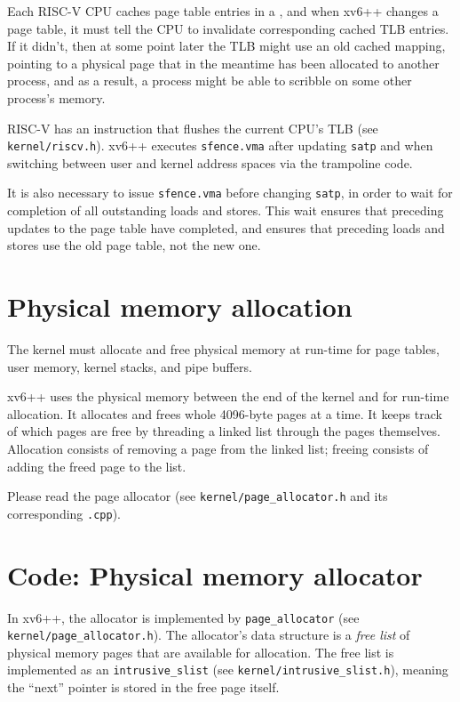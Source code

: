 Each RISC-V CPU caches page table entries in a
, and when xv6++ changes a
page table, it must tell the CPU to invalidate corresponding cached TLB
entries. If it didn't, then at some point later the TLB might use an old
cached mapping, pointing to a physical page that in the meantime has been
allocated to another process, and as a result, a process might be able to
scribble on some other process's memory.

RISC-V has an instruction  that flushes the current
CPU's TLB (see \texttt{kernel/riscv.h}). xv6++ executes \lstinline{sfence.vma}
after updating \texttt{satp} and when switching between user and kernel
address spaces via the trampoline code.

It is also necessary to issue \texttt{sfence.vma} before changing \texttt{satp},
in order to wait for completion of all outstanding loads and stores. This wait
ensures that preceding updates to the page table have completed, and ensures
that preceding loads and stores use the old page table, not the new one.

\section{Physical memory allocation}

The kernel must allocate and free physical memory at run-time for page
tables, user memory, kernel stacks, and pipe buffers.

xv6++ uses the physical memory between the end of the kernel and
 for run-time allocation. It allocates and frees whole
4096-byte pages at a time. It keeps track of which pages are free by
threading a linked list through the pages themselves. Allocation consists
of removing a page from the linked list; freeing consists of adding the
freed page to the list.

Please read the page allocator (see \texttt{kernel/page\_allocator.h} and its
corresponding \texttt{.cpp}).

\section{Code: Physical memory allocator}

In xv6++, the allocator is implemented by \lstinline{page_allocator}
(see \texttt{kernel/page\_allocator.h}). The allocator's data structure is a
\textit{free list} of physical memory pages that are available for allocation.
The free list is implemented as an \lstinline{intrusive_slist} (see
\texttt{kernel/intrusive\_slist.h}), meaning the ``next'' pointer is stored in
the free page itself.

